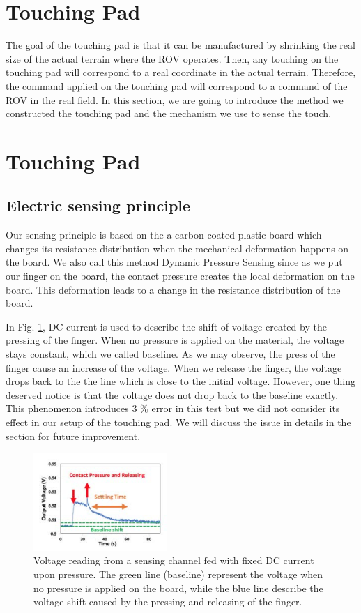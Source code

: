 \documentclass[reprint,amsmath, amsfonts, amssymb, aps, letterpaper]{revtex4-1}
\begin{document}
\section{Touching Pad}
The goal of the touching pad is that it can be manufactured by shrinking the real size of the actual terrain where the ROV operates. Then, any touching on the touching pad will correspond to a real coordinate in the actual terrain. Therefore, the command applied on the touching pad will correspond to a command of the ROV in the real field. In this section, we are going to introduce the method we constructed the touching pad and the mechanism we use to sense the touch.


\section{Touching Pad}

\subsection{Electric sensing principle}
Our sensing principle is based on the a carbon-coated plastic board which changes its resistance distribution when the mechanical deformation happens on the board. We also call this method Dynamic Pressure Sensing since as we put our finger on the board, the contact pressure creates the local deformation on the board. This deformation leads to a change in the resistance distribution of the board. 

In Fig. \ref{fig::pressure}, DC current is used to describe the shift of voltage created by the pressing of the finger. When no pressure is applied on the material, the voltage stays constant, which we called baseline. As we may observe, the press of the finger cause an increase of the voltage. When we release the finger, the voltage drops back to the the line which is close to the initial voltage. However, one thing deserved notice is that the voltage does not drop back to the baseline exactly. This phenomenon introduces 3 \% error in this test but we did not consider its effect in our setup of the touching pad. We will discuss the issue in details in the section for future improvement.

\begin{figure}[h]
\centering
    \includegraphics[width=0.45\textwidth]{./figure/pressure}     
       \caption{Voltage reading from a sensing channel fed with fixed DC current upon pressure. The green line (baseline) represent the voltage when no pressure is applied on the board, while the blue line describe the voltage shift caused by the pressing and releasing of the finger. \citep{isoft} }
    \label{fig::pressure}
\end{figure}
\end{document}
